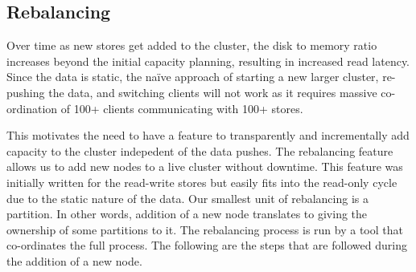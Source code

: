 
\subsection{Rebalancing}
\label{sec:read_only:data_cycle:rebalancing}

Over time as new stores get added to the cluster, the disk to memory
ratio increases beyond the initial capacity planning, resulting in
increased read latency. Since the data is static, the na\"{i}ve
approach of starting a new larger cluster, re-pushing the data, and
switching clients will not work as it requires massive co-ordination
of 100+ clients communicating with 100+ stores.

This motivates the need to have a feature to transparently and 
incrementally add capacity to the cluster indepedent of the data pushes. 
The rebalancing feature allows us to add new nodes to a live cluster without 
downtime. This feature was initially written for the read-write stores 
but easily fits into the read-only cycle due to the static nature 
of the data. Our smallest unit of rebalancing is a partition. In 
other words, addition of a new node translates to giving the ownership 
of some partitions to it. The rebalancing process is run by a tool that 
co-ordinates the full process. The following are the steps that
are followed during the addition of a new node. 

